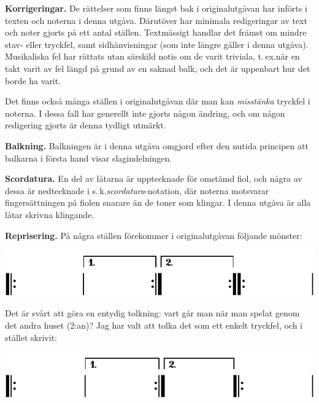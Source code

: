 {\vspace{3mm}
\textbf{Korrigeringar.} De rättelser som finns längst bak i originalutgåvan har
införts i texten och noterna i denna utgåva. Därutöver har minimala redigeringar
av text och noter gjorts på ett antal ställen. Textmässigt handlar det främst om
mindre stav- eller tryckfel, samt sidhänvisningar (som inte längre gäller i denna utgåva).
\guillemotright{}Musikaliska fel\guillemotright{} har rättats utan särskild notis
om de varit \guillemotright{}triviala\guillemotright{}, t.\,ex.\@ när en takt
varit av fel längd på grund av en saknad balk, och det är uppenbart hur det borde ha varit.

Det finns också många ställen i originalutgåvan där man kan \textit{misstänka}
tryckfel i noterna. I dessa fall har generellt inte gjorts någon ändring, och
om någon redigering gjorts är denna tydligt utmärkt.

\vspace{3mm}
\textbf{Balkning.} Balkningen är i denna utgåva omgjord efter den nutida principen
att balkarna i första hand visar slagindelningen.

\vspace{3mm}
\textbf{Scordatura.} En del av låtarna är upptecknade för omstämd fiol, och några av
dessa är nedtecknade i s.\,k.\@ \textit{scordatura}-notation, där noterna
motsvarar fingersättningen på fiolen snarare än de toner som klingar. I denna
utgåva är alla låtar skrivna klingande.

\vspace{3mm}
\textbf{Reprisering.} På några ställen förekommer i originalutgåvan följande mönster:

\vspace{3mm}
\includegraphics{include/snippets/repriser-fel-crop.pdf}
\vspace{3mm}

Det är svårt att göra en entydig tolkning: vart går man när man spelat genom det
andra \guillemotright{}huset\guillemotright{} (2:an)? Jag har valt att tolka det som ett enkelt tryckfel, och
i stället skrivit:

\vspace{3mm}
\includegraphics{include/snippets/repriser-ratt-crop.pdf}

}
\restoregeometry
\fancyhfoffset[E,O]{0pt}
